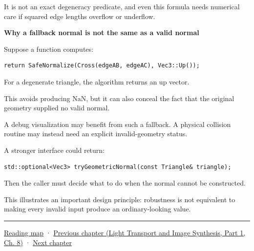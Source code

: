 It is not an exact degeneracy predicate, and even this formula needs numerical care if squared edge lengths overflow or underflow.

\textbf{Why a fallback normal is not the same as a valid normal}

Suppose a function computes:

\begin{verbatim}
return SafeNormalize(Cross(edgeAB, edgeAC), Vec3::Up());
\end{verbatim}

For a degenerate triangle, the algorithm returns an up vector.

This avoids producing NaN, but it can also conceal the fact that the original geometry supplied no valid normal.

A debug visualization may benefit from such a fallback. A physical collision routine may instead need an explicit invalid-geometry status.

A stronger interface could return:

\begin{verbatim}
std::optional<Vec3> tryGeometricNormal(const Triangle& triangle);
\end{verbatim}

Then the caller must decide what to do when the normal cannot be constructed.

This illustrates an important design principle: robustness is not equivalent to making every invalid input produce an ordinary-looking value.

\begin{center}\rule{0.5\linewidth}{0.5pt}\end{center}

\hyperref[volume-reading-map]{Reading map} · \href{../04-Light-Transport-and-Image-Synthesis-P01/main.pdf\#nameddest=03-visual-computing-i-ch019-textures-as-sampled-surface-signals}{Previous chapter (Light Transport and Image Synthesis, Part 1, Ch. 8)} · \hyperref[03-visual-computing-i-ch021-collision-implementations-and-repository-comparison]{Next chapter}
